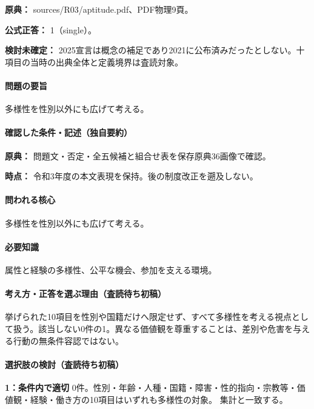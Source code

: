 \noindent\textbf{原典：} sources/R03/aptitude.pdf、PDF物理9頁。

\textbf{公式正答：} 1（single）。

\par\textbf{検討未確定：} 2025宣言は概念の補足であり2021に公布済みだったとしない。十項目の当時の出典全体と定義境界は査読対象。

\paragraph{問題の要旨} 多様性を性別以外にも広げて考える。

\paragraph{確認した条件・記述（独自要約）}\mbox{}\par

\noindent\textbf{原典：} 問題文・否定・全五候補と組合せ表を保存原典36画像で確認。\par

\noindent\textbf{時点：} 令和3年度の本文表現を保持。後の制度改正を遡及しない。\par

\paragraph{問われる核心} 多様性を性別以外にも広げて考える。

\paragraph{必要知識} 属性と経験の多様性、公平な機会、参加を支える環境。

\paragraph{考え方・正答を選ぶ理由（査読待ち初稿）} 挙げられた10項目を性別や国籍だけへ限定せず、すべて多様性を考える視点として扱う。該当しない0件の1。異なる価値観を尊重することは、差別や危害を与える行動の無条件容認ではない。

\paragraph{選択肢の検討（査読待ち初稿）}\mbox{}\par

\noindent\textbf{1：条件内で適切} 0件。性別・年齢・人種・国籍・障害・性的指向・宗教等・価値観・経験・働き方の10項目はいずれも多様性の対象。 集計と一致する。\par

